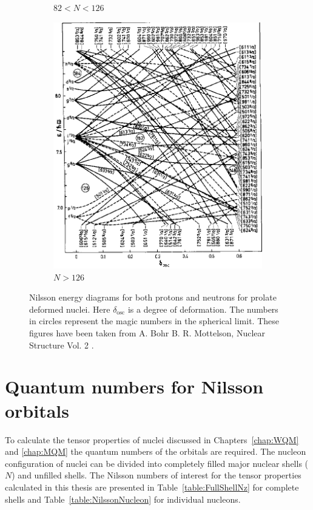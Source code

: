 \documentclass[10pt,a4paper, twoside, openright]{report}
\begin{document}
\begin{figure}
\begin{subfigure}[b]{0.48\textwidth}
    \caption{$82<N<126$}
\end{subfigure}	
\quad
\begin{subfigure}[b]{0.48\textwidth}
    \includegraphics[width=\textwidth]{./figures/Nilsson/neutron_deformed126.png}
    \caption{$N>126$}
\end{subfigure}
\caption[Nilsson Energy plots from Ref. \cite{BohrMottVol2}]{Nilsson energy diagrams for both protons and neutrons for prolate deformed nuclei. Here $\delta_{\text{osc}}$ is a degree of deformation. The numbers in circles represent the magic numbers in the spherical limit. These figures have been taken from A. Bohr B. R. Mottelson, Nuclear Structure Vol. 2 \cite{BohrMottVol2}. \label{fig:NilssonPlots}}

\end{figure}
\section{Quantum numbers for Nilsson orbitals}
To calculate the tensor properties of nuclei discussed in Chapters~\ref{chap:WQM} and \ref{chap:MQM} the quantum numbers of the orbitals are required. The nucleon configuration of nuclei can be divided into completely filled major nuclear shells ($N$) and unfilled shells. The Nilsson numbers of interest for the tensor properties calculated in this thesis are presented in Table~\ref{table:FullShellNz} for complete shells and Table~\ref{table:NilssonNucleon} for individual nucleons.
\end{document}
